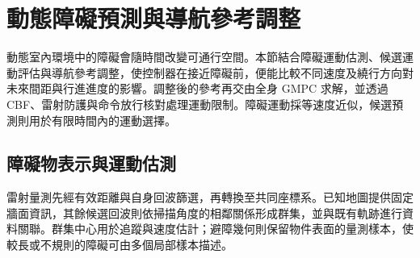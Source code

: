 

\section{動態障礙預測與導航參考調整}
\label{sec:dynamic_obstacle_avoidance}

動態室內環境中的障礙會隨時間改變可通行空間。本節結合障礙運動估測、候選運動評估與導航參考調整，使控制器在接近障礙前，便能比較不同速度及繞行方向對未來間距與行進進度的影響。調整後的參考再交由全身 GMPC 求解，並透過 CBF、雷射防護與命令放行核對處理運動限制。障礙運動採等速度近似，候選預測則用於有限時間內的運動選擇。

\subsection{障礙物表示與運動估測}
\label{subsec:obstacle_representation_prediction}

雷射量測先經有效距離與自身回波篩選，再轉換至共同座標系。已知地圖提供固定牆面資訊，其餘候選回波則依掃描角度的相鄰關係形成群集，並與既有軌跡進行資料關聯。群集中心用於追蹤與速度估計；避障幾何則保留物件表面的量測樣本，使較長或不規則的障礙可由多個局部樣本描述。

